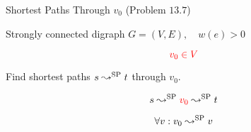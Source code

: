 \begin{frame}
  \begin{exampleblock}{Shortest Paths Through $v_0$ (Problem $13.7$)}
    \centerline{Strongly connected digraph $G = (V, E),\quad w(e) > 0$}
    \[
      \textcolor{red}{v_0 \in V}
    \]
    \centerline{Find shortest paths $s \leadsto^{\text{SP}} t$ through $v_0$.}
  \end{exampleblock}

  \pause
  \[
    s \leadsto^{\text{SP}} \textcolor{red}{v_0} \leadsto^{\text{SP}} t
  \]

  \pause
  \[
    \forall v: v_0 \leadsto^{\text{SP}} v
  \]
\end{frame}
